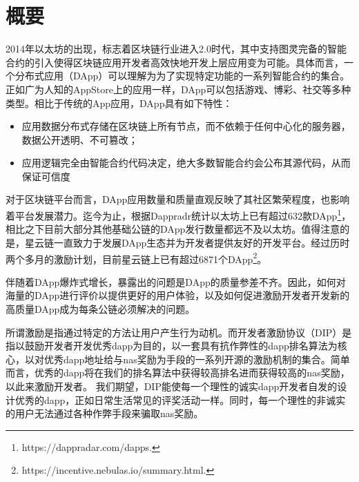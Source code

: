 \section{概要}


2014年以太坊的出现，标志着区块链行业进入2.0时代\cite{buterin2014next}，其中支持图灵完备的智能合约的引入使得区块链应用开发者高效快地开发上层应用变为可能。具体而言，一个分布式应用（DApp）可以理解为为了实现特定功能的一系列智能合约的集合。正如广为人知的AppStore上的应用一样，DApp可以包括游戏、博彩、社交等多种类型。相比于传统的App应用，DApp具有如下特性：

\begin{itemize}
	\item 应用数据分布式存储在区块链上所有节点，而不依赖于任何中心化的服务器，数据公开透明、不可篡改；
	\item 应用逻辑完全由智能合约代码决定，绝大多数智能合约会公布其源代码，从而保证可信度
\end{itemize}

对于区块链平台而言，DApp应用数量和质量直观反映了其社区繁荣程度，也影响着平台发展潜力。迄今为止，根据Dappradr统计以太坊上已有超过632款DApp\footnote{https://dappradar.com/dapps.}，相比之下目前大部分其他基础公链的DApp发行数量都远不及以太坊。值得注意的是，星云链一直致力于发展DApp生态并为开发者提供友好的开发平台。经过历时两个多月的激励计划，目前星云链上已有超过6871个DApp\footnote{https://incentive.nebulas.io/summary.html.}。

伴随着DApp爆炸式增长，暴露出的问题是DApp的质量参差不齐。因此，如何对海量的DApp进行评价以提供更好的用户体验，以及如何促进激励开发者开发新的高质量DApp成为每条公链必须解决的问题。


所谓激励是指通过特定的方法让用户产生行为动机。而开发者激励协议（DIP）是指以鼓励开发者开发优秀dapp为目的，以一套具有抗作弊性的dapp排名算法为核心，以对优秀dapp地址给与nas奖励为手段的一系列开源的激励机制的集合。简单而言，优秀的dapp将在我们的排名算法中获得较高排名进而获得较高的nas奖励，以此来激励开发者。 我们期望，DIP能使每一个理性的诚实dapp开发者自发的设计优秀的dapp，正如日常生活常见的评奖活动一样。同时，每一个理性的非诚实的用户无法通过各种作弊手段来骗取nas奖励。



